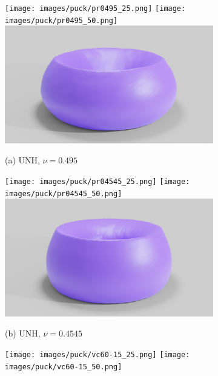 \begin{figure}
	\centering
	\begin{subfigure}{.24\linewidth}
		\centering
		\texttt{[image: images/puck/pr0495\_25.png]}
		\texttt{[image: images/puck/pr0495\_50.png]}
		{\includegraphics[width=1.4\textwidth]{images/puck/pr0495_render.jpg}}
		\caption*{(a) UNH, $\nu = 0.495$}
		\label{sfig:puck-pr0495}
	\end{subfigure}%
	\begin{subfigure}{.24\linewidth}
		\centering
		\texttt{[image: images/puck/pr04545\_25.png]}
		\texttt{[image: images/puck/pr04545\_50.png]}
		{\includegraphics[width=1.4\textwidth]{images/puck/pr045_render.jpg}}
		\caption*{(b) UNH, $\nu = 0.4545$}
		\label{sfig:puck-pr04545}
	\end{subfigure}%
	\begin{subfigure}{.24\linewidth}
		\centering
		\texttt{[image: images/puck/vc60-15\_25.png]}
		\texttt{[image: images/puck/vc60-15\_50.png]}

\end{subfigure}
\end{figure}
